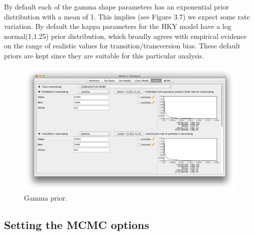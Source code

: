 \documentclass[11pt]{article}
\newcommand{\TODO}[1]{}
\theoremstyle{plain}%
\theoremstyle{definition}
\theoremstyle{remark}
\begin{document}
By default each of the gamma shape parameters has an exponential prior
distribution with a mean of 1. This implies (see Figure 3.7) we expect some
rate variation. By default the kappa parameters for the HKY model have a log
normal(1,1.25) prior distribution, which broadly agrees with empirical evidence
\cite{rosenberg2003patterns} on the range of realistic values for transition/transversion
bias. These default priors are kept since they are suitable for this particular
analysis.

\begin{figure}
\includegraphics[width=\textwidth]{figures/GammaPrior}
\caption{Gamma prior.}
\label{fig:GammaPrior}
\end{figure}



\subsection{Setting the MCMC options}

\end{document}
